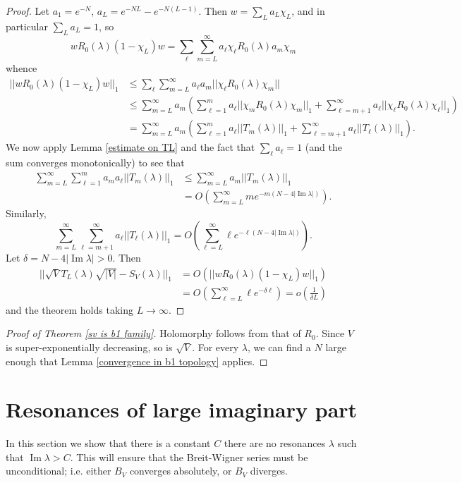 \documentclass[12pt]{report}
\renewcommand{\Im}{\operatorname{Im}}
\theoremstyle{definition}
\begin{document}
\begin{proof}
Let $a_1 = e^{-N}$, $a_L = e^{-NL} - e^{-N(L-1)}$. Then $w = \sum_L a_L \chi_L$, and in particular $\sum_L a_L = 1$, so
$$wR_0(\lambda)(1 - \chi_L)w = \sum_\ell \sum_{m=L}^\infty a_\ell\chi_\ell R_0(\lambda) a_m \chi_m$$
whence
\begin{align*}
  ||wR_0(\lambda)(1 - \chi_L)w||_1 &\leq \sum_\ell \sum_{m=L}^\infty a_\ell a_m ||\chi_\ell R_0(\lambda) \chi_m||\\
  &\leq \sum_{m=L}^\infty a_m \left(\sum_{\ell=1}^m a_\ell ||\chi_m R_0(\lambda) \chi_m||_1 + \sum_{\ell=m+1}^\infty a_\ell ||\chi_\ell R_0(\lambda) \chi_\ell||_1 \right)\\
  &= \sum_{m=L}^\infty a_m \left(\sum_{\ell=1}^m a_\ell ||T_m(\lambda)||_1 + \sum_{\ell=m+1}^\infty a_\ell ||T_\ell(\lambda)||_1 \right).
\end{align*}
We now apply Lemma \ref{estimate on TL} and the fact that $\sum_\ell a_\ell = 1$ (and the sum converges monotonically) to see that
\begin{align*}
  \sum_{m=L}^\infty\sum_{\ell=1}^m a_m a_\ell ||T_m(\lambda)||_1 &\leq \sum_{m=L}^\infty a_m ||T_m(\lambda)||_1\\
  &= O\left(\sum_{m=L}^\infty me^{-m(N-4|\Im \lambda|)}\right).
\end{align*}
Similarly,
$$\sum_{m=L}^\infty \sum_{\ell=m+1}^\infty a_\ell ||T_\ell(\lambda)||_1 = O\left(\sum_{\ell=L}^\infty \ell e^{-\ell(N-4|\Im \lambda|)}\right).$$
Let $\delta = N - 4|\Im \lambda| > 0$. Then
\begin{align*}
  ||\sqrt V T_L(\lambda) \sqrt{|V|} - S_V(\lambda)||_1 &= O(||wR_0(\lambda)(1 - \chi_L)w||_1) \\
  &= O\left(\sum_{\ell=L}^\infty \ell e^{-\delta \ell} \right) = o\left(\frac{1}{\delta L}\right)
\end{align*}
and the theorem holds taking $L \to \infty$.
\end{proof}

\begin{proof}[Proof of Theorem \ref{sv is b1 family}]
Holomorphy follows from that of $R_0$. Since $V$ is super-exponentially decreasing, so is $\sqrt V$. For every $\lambda$, we can find a $N$ large enough that Lemma \ref{convergence in b1 topology} applies.
\end{proof}




\section{Resonances of large imaginary part}
In this section we show that there is a constant $C$ there are no resonances $\lambda$ such that $\Im \lambda > C$. This will ensure that the Breit-Wigner series must be unconditional; i.e. either $B_V$ converges absolutely, or $B_V$ diverges.
\end{document}
